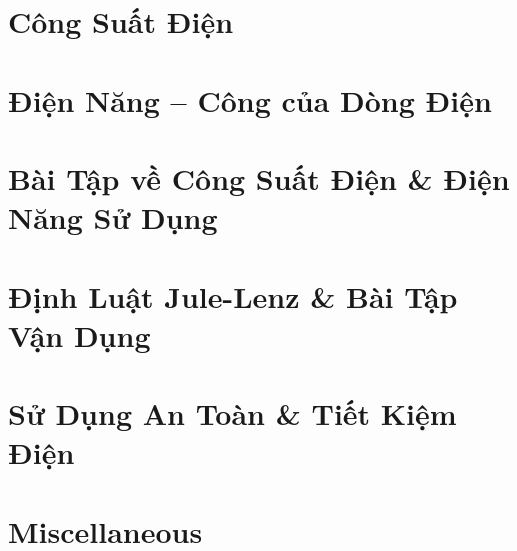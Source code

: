 \documentclass{article}
\begin{document}

\section{Công Suất Điện}


\section{Điện Năng -- Công của Dòng Điện}


\section{Bài Tập về Công Suất Điện \& Điện Năng Sử Dụng}


\section{Định Luật Jule-Lenz \& Bài Tập Vận Dụng}


\section{Sử Dụng An Toàn \& Tiết Kiệm Điện}


\section{Miscellaneous}


\printbibliography[heading=bibintoc]
	
\end{document}
